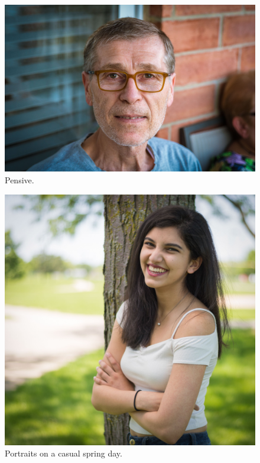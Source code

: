 \documentclass{report}
\begin{document}
\begin{figure}
  \includegraphics[width=\linewidth]{res/portraitheadshot.jpg}
  \caption{Pensive.}
\end{figure}

\begin{figure}
  \includegraphics[width=\linewidth]{res/portraittree.jpg}
  \caption{Portraits on a casual spring day.}
\end{figure}
\end{document}
